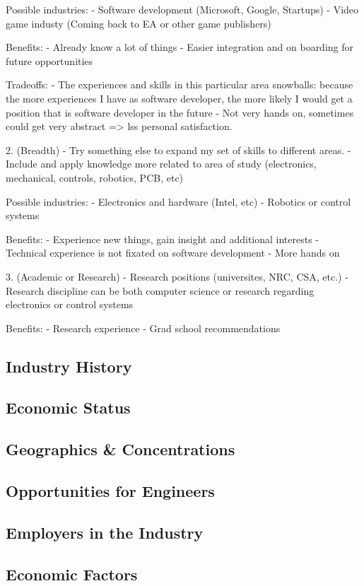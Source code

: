 \documentclass[10pt,letterpaper]{article}
\begin{document}
Possible industries:
- Software development (Microsoft, Google, Startups)
- Video game industy (Coming back to EA or other game publishers)

Benefits:
- Already know a lot of things
- Easier integration and on boarding for future opportunities

Tradeoffs:
- The experiences and skills in this particular area snowballs: because the more experiences I have as software developer, the more likely I would get a position that is software developer in the future
- Not very hands on, sometimes could get very abstract => lss personal satisfaction.

2. (Breadth)
- Try something else to expand my set of skills to different areas.
- Include and apply knowledge more related to area of study (electronics, mechanical, controls, robotics, PCB, etc)

Possible industries:
- Electronics and hardware (Intel, etc)
- Robotics or control systems

Benefits:
- Experience new things, gain insight and additional interests
- Technical experience is not fixated on software development
- More hands on

3. (Academic or Research)
- Research positions (universites, NRC, CSA, etc.)
- Research discipline can be both computer science or research regarding electronics or control systems

Benefits:
- Research experience
- Grad school recommendations

\subsection{Industry History}
\subsection{Economic Status}
\subsection{Geographics \& Concentrations}
\subsection{Opportunities for Engineers}
\subsection{Employers in the Industry}
\subsection{Economic Factors}
\end{document}
